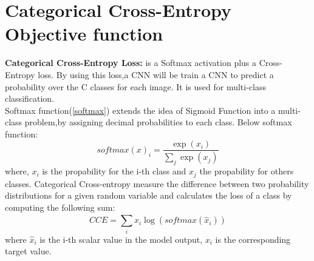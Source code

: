 \section{Categorical Cross-Entropy Objective function}
\textbf{Categorical Cross-Entropy Loss:} is a Softmax activation plus a Cross-Entropy loss. By using this loss,a CNN will be train a CNN to predict a probability over the 
C classes for each image. It is used for multi-class classification.\\
Softmax function(\ref{softmax}) extends the idea of Sigmoid Function into a multi-class problem,by assigning decimal probabilities to each class. Below softmax function:
\begin{equation}
    softmax(x)_i = \frac{\exp(x_i)}{\sum_{j}^{ }\exp(x_j)}
    \label{softmax}
\end{equation}
where, $x_i$  is the propability for the i-th class and $x_j$ the propability for others classes.
Categorical Cross-entropy measure the difference between two probability distributions for a given random variable and calculates the loss of a class by computing the following sum:
\begin{equation}
    CCE = {\sum_{i}^{ }x_i \log(softmax(\hat{x}_i))}
    \label{softmax}
\end{equation}
where $\hat{x}_i$ is the i-th scalar value in the model output, $x_i$ is the corresponding target value.\\

